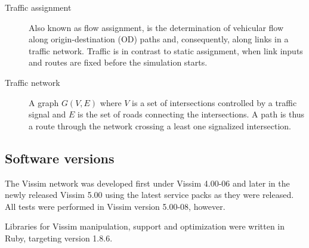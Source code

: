 \begin{description}
\item[Traffic assignment] Also known as flow assignment, is the determination of vehicular flow along origin-destination (OD) paths and, consequently, along links in a traffic network. Traffic is in contrast to static assignment, when link inputs and routes are fixed before the simulation starts.

\item[Traffic network] A graph $G(V,E)$ where $V$ is a set of intersections controlled by a traffic signal and $E$ is the set of roads connecting the intersections. A path is thus a route through the network crossing a least one signalized intersection.

\end{description}

\subsection{Software versions}
The Vissim network was developed first under Vissim 4.00-06 and later in the newly released Vissim 5.00 using the latest service packs as they were released. All tests were performed in Vissim version 5.00-08, however. 

Libraries for Vissim manipulation, support and optimization were written in Ruby, targeting version 1.8.6.
